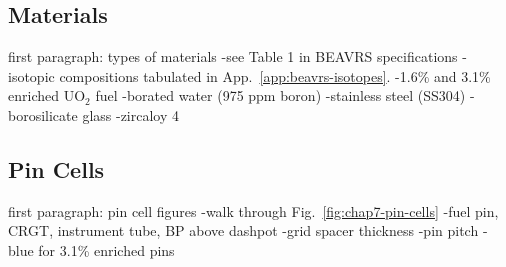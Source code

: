 \subsection{Materials}
\label{subsec:chap7-materials}

first paragraph: types of materials
-see Table 1 in BEAVRS specifications
-isotopic compositions tabulated in App.~\ref{app:beavrs-isotopes}.
-1.6\% and 3.1\% enriched UO$_2$ fuel
-borated water (975 ppm boron)
-stainless steel (SS304)
-borosilicate glass
-zircaloy 4

\subsection{Pin Cells}
\label{subsec:chap7-pin-cells}

first paragraph: pin cell figures
-walk through Fig.~\ref{fig:chap7-pin-cells}
-fuel pin, \ac{CRGT}, instrument tube, \ac{BP} above dashpot
-grid spacer thickness
-pin pitch
-blue for 3.1\% enriched pins

